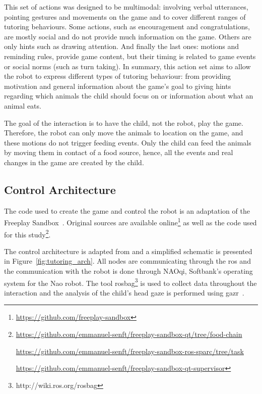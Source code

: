 This set of actions was designed to be multimodal: involving verbal utterances, pointing gestures and movements on the game and to cover different ranges of tutoring behaviours. Some actions, such as encouragement and congratulations, are mostly social and do not provide much information on the game. Others are only hints such as drawing attention. And finally the last ones: motions and reminding rules, provide game content, but their timing is related to game events or social norms (such as turn taking). In summary, this action set aims to allow the robot to express different types of tutoring behaviour: from providing motivation and general information about the game's goal to giving hints regarding which animals the child should focus on or information about what an animal eats. %

The goal of the interaction is to have the child, not the robot, play the game. Therefore, the robot can only move the animals to location on the game, and these motions do not trigger feeding events. Only the child can feed the animals by moving them in contact of a food source, hence, all the events and real changes in the game are created by the child. 
\subsection{Control Architecture}\label{sec:tuto_arch}

The code used to create the game and control the robot is an adaptation of the Freeplay Sandbox~\citep{lemaignan2017free}. Original sources are available online\footnote{\url{https://github.com/freeplay-sandbox}} as well as the code used for this study\footnote{\url{https://github.com/emmanuel-senft/freeplay-sandbox-qt/tree/food-chain}
	
\url{https://github.com/emmanuel-senft/freeplay-sandbox-ros-sparc/tree/task}
	
\url{https://github.com/emmanuel-senft/freeplay-sandbox-qt-supervisor}}.

The control architecture is adapted from \cite{lemaignan2017free} and a simplified schematic is presented in Figure~\ref{fig:tutoring_arch}. All nodes are communicating through the \gls{ros} \citep{quigley2009ros} and the communication with the robot is done through NAOqi, Softbank's operating system for the Nao robot. The tool rosbag\footnote{http://wiki.ros.org/rosbag} is used to collect data throughout the interaction and the analysis of the child's head gaze is performed using gazr~\citep{lemaignan2016real}.


